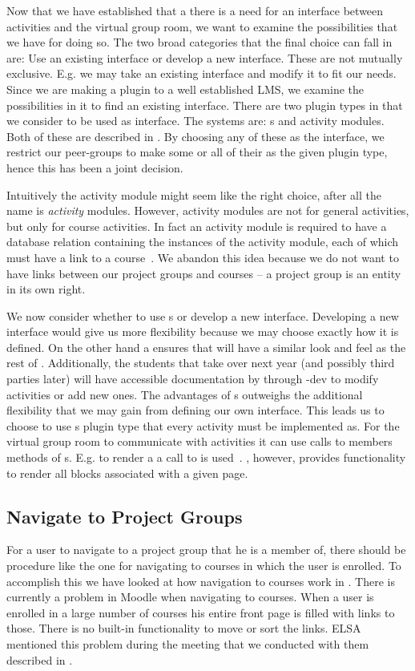 Now that we have established that a there is a need for an interface between activities and the virtual group room, we want to examine the possibilities that we have for doing so.
The two broad categories that the final choice can fall in are: Use an existing interface or develop a new interface.
These are not mutually exclusive.
E.g. we may take an existing interface and modify it to fit our needs.
Since we are making a plugin to a well established LMS, we examine the possibilities in it to find an existing interface.
There are two plugin types in \moodle{} that we consider to be used as interface.
The systems are: \block{}s and activity modules.
Both of these are described in .
By choosing any of these as the interface, we restrict our peer-groups to make some or all of their \subsystem{} as the given plugin type, hence this has been a joint decision.

Intuitively the activity module might seem like the right choice, after all the name is \emph{activity} modules.
However, activity modules are not for general activities, but only for course activities.
In fact an activity module is required to have a database relation containing the instances of the activity module, each of which must have a link to a course~\cite{moodleactivitymodule}.
We abandon this idea because we do not want to have links between our project groups and courses -- a project group is an entity in its own right.

We now consider whether to use \block{}s or develop a new interface.
Developing a new interface would give us more flexibility because we may choose exactly how it is defined.
On the other hand a \block{} ensures that \system{} will have a similar look and feel as the rest of \moodle{}.
Additionally, the students that take over next year (and possibly third parties later) will have accessible documentation by through \moodle{}-dev to modify activities or add new ones.
The advantages of \block{}s outweighs the additional flexibility that we may gain from defining our own interface.
This leads us to choose to use \block{}s plugin type that every activity must be implemented as.
For the virtual group room to communicate with activities it can use calls to members methods of \block{}s.
E.g. to render a \block{} a call to  is used~\cite{moodleblockapp}.
\moodle{}, however, provides functionality to render all blocks associated with a given page.


\subsection{Navigate to Project Groups}
\label{sub:designprojectgroupnavigation}
For a user to navigate to a project group that he is a member of, there should be procedure like the one for navigating to courses in which the user is enrolled.
To accomplish this we have looked at how navigation to courses work in \moodle{}.
There is currently a problem in Moodle when navigating to courses. 
When a user is enrolled in a large number of courses his entire front page is filled with links to those.
There is no built-in functionality to move or sort the links.
ELSA mentioned this problem during the meeting that we conducted with them described in .

